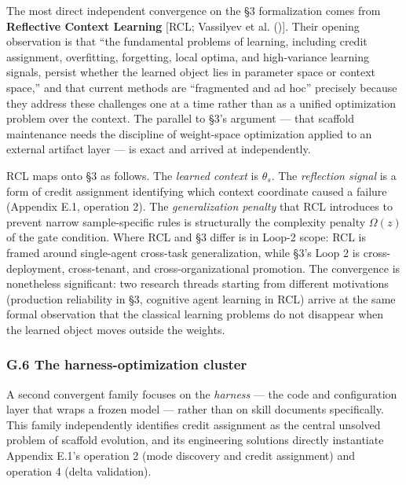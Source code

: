 \documentclass[
]{article}
\newcounter{none} %
\begin{document}
The most direct independent convergence on the §3 formalization comes
from \textbf{Reflective Context Learning} {[}RCL; Vassilyev et al.
(){]}. Their opening observation is
that ``the fundamental problems of learning, including credit
assignment, overfitting, forgetting, local optima, and high-variance
learning signals, persist whether the learned object lies in parameter
space or context space,'' and that current methods are ``fragmented and
ad hoc'' precisely because they address these challenges one at a time
rather than as a unified optimization problem over the context. The
parallel to §3's argument --- that scaffold maintenance needs the
discipline of weight-space optimization applied to an external artifact
layer --- is exact and arrived at independently.

RCL maps onto §3 as follows. The \emph{learned context} is \(\theta_s\).
The \emph{reflection signal} is a form of credit assignment identifying
which context coordinate caused a failure (Appendix E.1, operation 2).
The \emph{generalization penalty} that RCL introduces to prevent narrow
sample-specific rules is structurally the complexity penalty
\(\Omega(z)\) of the gate condition. Where RCL and §3 differ is in
Loop-2 scope: RCL is framed around single-agent cross-task
generalization, while §3's Loop 2 is cross-deployment, cross-tenant, and
cross-organizational promotion. The convergence is nonetheless
significant: two research threads starting from different motivations
(production reliability in §3, cognitive agent learning in RCL) arrive
at the same formal observation that the classical learning problems do
not disappear when the learned object moves outside the weights.

\subsubsection{G.6 The harness-optimization
cluster}\label{g.6-the-harness-optimization-cluster}

A second convergent family focuses on the \emph{harness} --- the code
and configuration layer that wraps a frozen model --- rather than on
skill documents specifically. This family independently identifies
credit assignment as the central unsolved problem of scaffold evolution,
and its engineering solutions directly instantiate Appendix E.1's
operation 2 (mode discovery and credit assignment) and operation 4
(delta validation).
\end{document}
